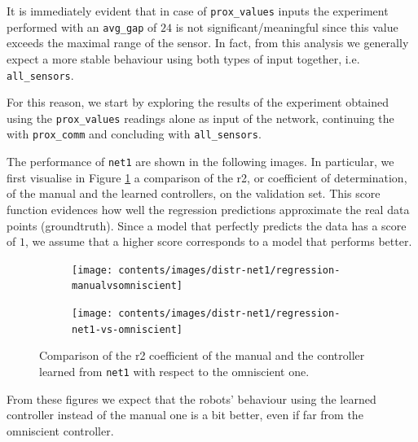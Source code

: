 It is immediately evident that in case of \texttt{prox\_values} inputs the 
experiment performed with an \texttt{avg\_gap} of $24$ is not 
significant/meaningful since this value exceeds the maximal range of the sensor.
In fact, from this analysis we generally expect a more stable behaviour using both 
types of input together, i.e. \texttt{all\_sensors}. 

For this reason, we start by exploring the results of the experiment obtained 
using 
the \texttt{prox\_values} readings alone as input of the network, continuing the 
with \texttt{prox\_comm} and concluding with \texttt{all\_sensors}.

The performance of \texttt{net1} are shown in the following images. In particular, 
we first visualise in Figure \ref{fig:net1r2} a comparison of the \gls{r2}, or 
coefficient of determination, of the manual and the learned controllers, on the 
validation set.
This score function evidences how well the regression predictions approximate 
the real data points (groundtruth). Since a model that perfectly predicts the data 
has a score of $1$, we assume that a higher score corresponds to a model that 
performs better.
\begin{figure}[!htb]
	\centering
	\begin{subfigure}[h]{0.49\textwidth}
		\centering
		\texttt{[image: contents/images/distr-net1/regression-manualvsomniscient]}%
	\end{subfigure}
	\hfill
	\begin{subfigure}[h]{0.49\textwidth}
		\centering
		\texttt{[image: contents/images/distr-net1/regression-net1-vs-omniscient]}
	\end{subfigure}

	\caption[Evaluation of the \gls{r2} coefficient of \texttt{net1} .]{Comparison of 
	the \gls{r2} coefficient of the manual and the controller learned from 
	\texttt{net1} with respect to the omniscient one.}
	\label{fig:net1r2}
\end{figure}

From these figures we expect that the robots' behaviour using the learned 
controller instead of the manual one is a bit better, even if far from the 
omniscient 
controller.

